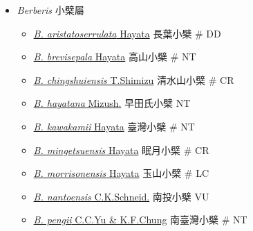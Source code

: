 
  \begin{itemize}
 \item[] \textit{Berberis} 小檗屬
                                
  \begin{itemize}
        \item[] \href{http://www.theplantlist.org/tpl1.1/search?q=Berberis+aristatoserrulata}{\textit{B. aristatoserrulata} Hayata}   長葉小檗  \# DD
        \item[] \href{http://www.theplantlist.org/tpl1.1/search?q=Berberis+brevisepala}{\textit{B. brevisepala} Hayata}   高山小檗  \# NT
        \item[] \href{http://www.theplantlist.org/tpl1.1/search?q=Berberis+chingshuiensis}{\textit{B. chingshuiensis} T.Shimizu}   清水山小檗  \# CR
        \item[] \href{http://www.theplantlist.org/tpl1.1/search?q=Berberis+hayatana}{\textit{B. hayatana} Mizush.}   早田氏小檗   NT
        \item[] \href{http://www.theplantlist.org/tpl1.1/search?q=Berberis+kawakamii}{\textit{B. kawakamii} Hayata}   臺灣小檗  \# NT
        \item[] \href{http://www.theplantlist.org/tpl1.1/search?q=Berberis+mingetsuensis}{\textit{B. mingetsuensis} Hayata}   眠月小檗  \# CR
        \item[] \href{http://www.theplantlist.org/tpl1.1/search?q=Berberis+morrisonensis}{\textit{B. morrisonensis} Hayata}   玉山小檗  \# LC
        \item[] \href{http://www.theplantlist.org/tpl1.1/search?q=Berberis+nantoensis}{\textit{B. nantoensis} C.K.Schneid.}   南投小檗   VU
        \item[] \href{http://www.theplantlist.org/tpl1.1/search?q=Berberis+pengii}{\textit{B. pengii} C.C.Yu \& K.F.Chung}   南臺灣小檗  \# NT

\end{itemize}
\end{itemize}
